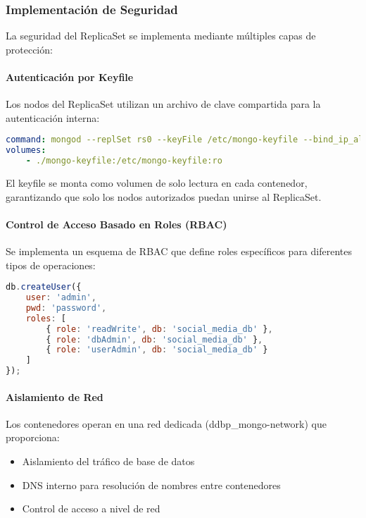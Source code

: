\documentclass[12pt,letterpaper]{article}
\begin{document}
\subsubsection{Implementación de Seguridad}
La seguridad del ReplicaSet se implementa mediante múltiples capas de protección:

\paragraph{Autenticación por Keyfile}
Los nodos del ReplicaSet utilizan un archivo de clave compartida para la autenticación interna:

\begin{lstlisting}[language=yaml]
command: mongod --replSet rs0 --keyFile /etc/mongo-keyfile --bind_ip_all --auth --port 27017
volumes:
    - ./mongo-keyfile:/etc/mongo-keyfile:ro
\end{lstlisting}

El keyfile se monta como volumen de solo lectura en cada contenedor, garantizando que solo los nodos autorizados puedan unirse al ReplicaSet.

\paragraph{Control de Acceso Basado en Roles (RBAC)}
Se implementa un esquema de RBAC que define roles específicos para diferentes tipos de operaciones:

\begin{lstlisting}[language=javascript]
db.createUser({
    user: 'admin',
    pwd: 'password',
    roles: [
        { role: 'readWrite', db: 'social_media_db' },
        { role: 'dbAdmin', db: 'social_media_db' },
        { role: 'userAdmin', db: 'social_media_db' }
    ]
});
\end{lstlisting}

\paragraph{Aislamiento de Red}
Los contenedores operan en una red dedicada (ddbp_mongo-network) que proporciona:

\begin{itemize}
    \item Aislamiento del tráfico de base de datos
    \item DNS interno para resolución de nombres entre contenedores
    \item Control de acceso a nivel de red
\end{itemize}
\end{document}
